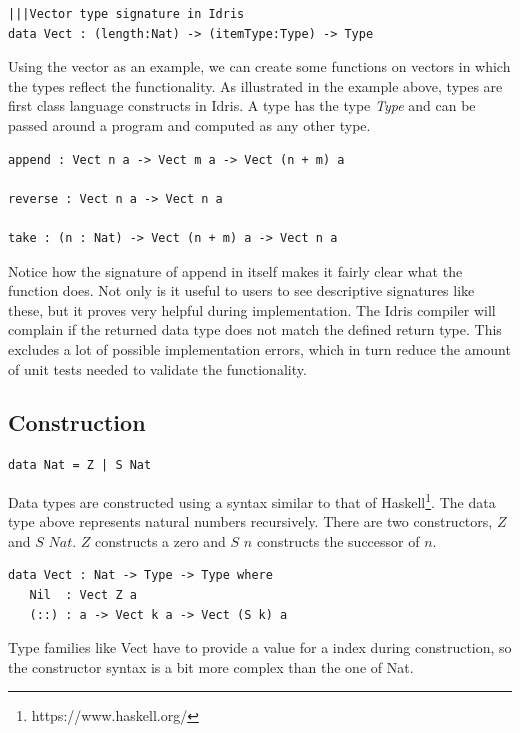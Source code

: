 \documentclass[12pt]{article}
\begin{document}
\begin{lstlisting}
|||Vector type signature in Idris
data Vect : (length:Nat) -> (itemType:Type) -> Type
\end{lstlisting}

Using the vector as an example, we can create some functions on vectors in which the types reflect the functionality. As illustrated in the example above, types are first class language constructs in Idris. A type has the type \textit{Type} and can be passed around a program and computed as any other type.

\begin{lstlisting}
append : Vect n a -> Vect m a -> Vect (n + m) a

reverse : Vect n a -> Vect n a

take : (n : Nat) -> Vect (n + m) a -> Vect n a
\end{lstlisting}

Notice how the signature of append in itself makes it fairly clear what the function does.
Not only is it useful to users to see descriptive signatures like these, but it proves very helpful during implementation.
The Idris compiler will complain if the returned data type does not match the defined return type.
This excludes a lot of possible implementation errors, which in turn reduce the amount of unit tests needed to validate the functionality.

\subsection{Construction}

\begin{lstlisting}
data Nat = Z | S Nat 
\end{lstlisting}

Data types are constructed using a syntax similar to that of Haskell\footnote{https://www.haskell.org/}.
The data type above represents natural numbers recursively.
There are two constructors, $Z$ and $S$ $Nat$.
$Z$ constructs a zero and $S$ $n$ constructs the successor of $n$.

\begin{lstlisting}
data Vect : Nat -> Type -> Type where
   Nil  : Vect Z a
   (::) : a -> Vect k a -> Vect (S k) a
\end{lstlisting}

Type families like Vect have to provide a value for a index during construction, so the constructor syntax is a bit more complex than the one of Nat.
\end{document}
